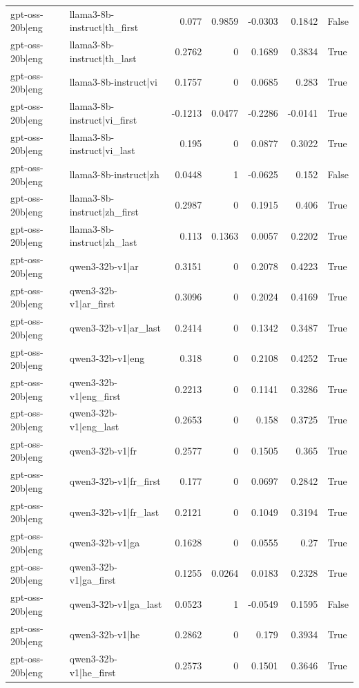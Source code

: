 \begin{table}
\begin{tabular}{l l r r r r l}
gpt-oss-20b|eng & llama3-8b-instruct|th_first & 0.077 & 0.9859 & -0.0303 & 0.1842 & False \\
gpt-oss-20b|eng & llama3-8b-instruct|th_last & 0.2762 & 0 & 0.1689 & 0.3834 & True \\
gpt-oss-20b|eng & llama3-8b-instruct|vi & 0.1757 & 0 & 0.0685 & 0.283 & True \\
gpt-oss-20b|eng & llama3-8b-instruct|vi_first & -0.1213 & 0.0477 & -0.2286 & -0.0141 & True \\
gpt-oss-20b|eng & llama3-8b-instruct|vi_last & 0.195 & 0 & 0.0877 & 0.3022 & True \\
gpt-oss-20b|eng & llama3-8b-instruct|zh & 0.0448 & 1 & -0.0625 & 0.152 & False \\
gpt-oss-20b|eng & llama3-8b-instruct|zh_first & 0.2987 & 0 & 0.1915 & 0.406 & True \\
gpt-oss-20b|eng & llama3-8b-instruct|zh_last & 0.113 & 0.1363 & 0.0057 & 0.2202 & True \\
gpt-oss-20b|eng & qwen3-32b-v1|ar & 0.3151 & 0 & 0.2078 & 0.4223 & True \\
gpt-oss-20b|eng & qwen3-32b-v1|ar_first & 0.3096 & 0 & 0.2024 & 0.4169 & True \\
gpt-oss-20b|eng & qwen3-32b-v1|ar_last & 0.2414 & 0 & 0.1342 & 0.3487 & True \\
gpt-oss-20b|eng & qwen3-32b-v1|eng & 0.318 & 0 & 0.2108 & 0.4252 & True \\
gpt-oss-20b|eng & qwen3-32b-v1|eng_first & 0.2213 & 0 & 0.1141 & 0.3286 & True \\
gpt-oss-20b|eng & qwen3-32b-v1|eng_last & 0.2653 & 0 & 0.158 & 0.3725 & True \\
gpt-oss-20b|eng & qwen3-32b-v1|fr & 0.2577 & 0 & 0.1505 & 0.365 & True \\
gpt-oss-20b|eng & qwen3-32b-v1|fr_first & 0.177 & 0 & 0.0697 & 0.2842 & True \\
gpt-oss-20b|eng & qwen3-32b-v1|fr_last & 0.2121 & 0 & 0.1049 & 0.3194 & True \\
gpt-oss-20b|eng & qwen3-32b-v1|ga & 0.1628 & 0 & 0.0555 & 0.27 & True \\
gpt-oss-20b|eng & qwen3-32b-v1|ga_first & 0.1255 & 0.0264 & 0.0183 & 0.2328 & True \\
gpt-oss-20b|eng & qwen3-32b-v1|ga_last & 0.0523 & 1 & -0.0549 & 0.1595 & False \\
gpt-oss-20b|eng & qwen3-32b-v1|he & 0.2862 & 0 & 0.179 & 0.3934 & True \\
gpt-oss-20b|eng & qwen3-32b-v1|he_first & 0.2573 & 0 & 0.1501 & 0.3646 & True \\

\end{tabular}
\end{table}
